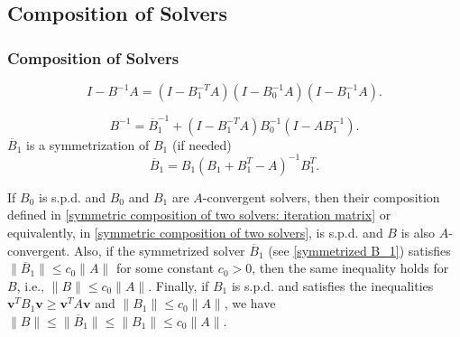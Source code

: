 \documentclass[xcolor=dvipsnames]{beamer}
\def\bv{{\mathbf v}}
\begin{document}
\subsection{Composition of Solvers}
\begin{frame}
  \frametitle{Composition of Solvers}
\begin{equation}\label{symmetric composition of two solvers: iteration matrix}
I- B^{-1} A = (I-B^{-T}_1 A) (I-B^{-1}_0A)(I-B^{-1}_1 A).
\end{equation}

\begin{equation}\label{symmetric composition of two solvers}
B^{-1} = {\overline B}^{-1}_1 + (I-B^{-T}_1A) B^{-1}_0 (I-AB^{-1}_1).
\end{equation}
${\overline B}_1$ is a symmetrization of $B_1$ (if needed)
\begin{equation}\label{symmetrized B_1}
{\overline B}_1 = B_1 (B_1+B^T_1-A)^{-1} B^T_1.
\end{equation}

  \begin{lemma}\label{lemma: properties of composite solvers}
    If $B_0$ is s.p.d. and $B_0$ and $B_1$ are $A$-convergent solvers, then their composition defined in \eqref{symmetric composition of two solvers: iteration matrix} or equivalently, in \eqref{symmetric composition of two solvers}, is s.p.d. and $B$ is also $A$-convergent. Also, if the symmetrized solver ${\overline B}_1$ (see \eqref{symmetrized B_1}) satisfies 
    $\|{\overline B}_1\| \le c_0\|A\|$ for some constant $c_0 >0$, then the same inequality holds for $B$, i.e., $\|B\| \le c_0\|A\|$.
    Finally, if $B_1$ is s.p.d. and satisfies the inequalities
    $\bv^T B_1 \bv \ge \bv^T A \bv$ and $\|B_1\| \le c_0 \|A\|$, we have $\|B\| \le \|{\overline B}_1\| \le \|B_1\| \le c_0 \|A\|$.
    \end{lemma}
\end{frame}
\end{document}
